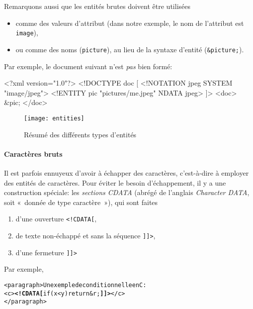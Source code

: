 Remarquons aussi que les entités brutes doivent être utilisées
\begin{itemize}

  \item comme des valeurs d'attribut (dans
    notre exemple, le nom de l'attribut est \texttt{image}),

  \item ou comme des noms (\texttt{picture}), au lieu de la syntaxe
    d'entité (\texttt{\&picture;}).

\end{itemize}
Par exemple, le document suivant n'est \emph{pas} bien formé:
\begin{sverb}
<?xml version="1.0"?>
<!DOCTYPE doc [
  <!NOTATION jpeg SYSTEM "image/jpeg">
  <!ENTITY pic "pictures/me.jpeg" NDATA jpeg>
]>
<doc>
  &pic;
</doc>
\end{sverb}
\begin{figure}
\begin{center}
\texttt{[image: entities]}
\end{center}
\caption{Résumé des différents types d'entités}
\end{figure}

\paragraph{Caractères bruts}

Il est parfois ennuyeux d'avoir à échapper des caractères,
c'est-à-dire à employer des entités de caractères. Pour éviter le
besoin d'échappement, il y a une construction spéciale: les
\emph{sections CDATA} (abrégé de l'anglais \emph{Character DATA}, soit
«~donnée de type caractère~»), qui sont faites
\begin{enumerate}

  \item d'une ouverture \verb|<!CDATA[|,

  \item de texte non-échappé et sans la séquence \verb|]]>|,

  \item d'une fermeture \verb|]]>|

\end{enumerate}
Par exemple,
\begin{alltt}
\small<paragraph>Un exemple de conditionnelle en C:
  <c>\textbf{<!CDATA[}if (x < y) return &r;\textbf{]]>}</c>
</paragraph>
\end{alltt}

